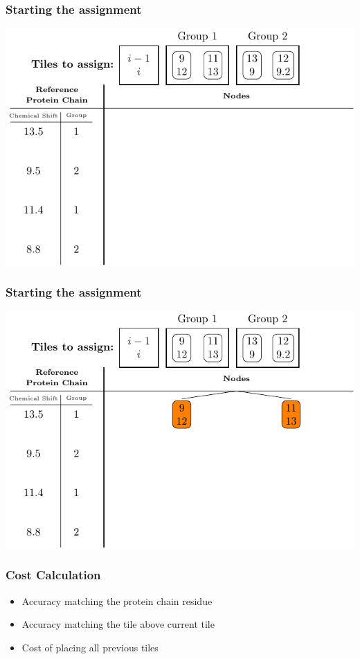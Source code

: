 \documentclass{beamer}
\begin{document}
\begin{frame}
	\frametitle{Starting the assignment}
	\vspace{-.5cm}
	\center
	\includegraphics[width=.9\textwidth]{tilePlacement/step1}
\end{frame}

\begin{frame}
	\frametitle{Starting the assignment}
	\vspace{-.5cm}
	\center
	\includegraphics[width=.9\textwidth]{tilePlacement/step2}
\end{frame}

\begin{frame}
	\frametitle{Cost Calculation}
	\begin{itemize}
		\item Accuracy matching the protein chain residue
		\vspace{12pt}
		\item Accuracy matching the tile above current tile
		\vspace{12pt}
		\item Cost of placing all previous tiles
	\end{itemize}
\end{frame}
\end{document}

